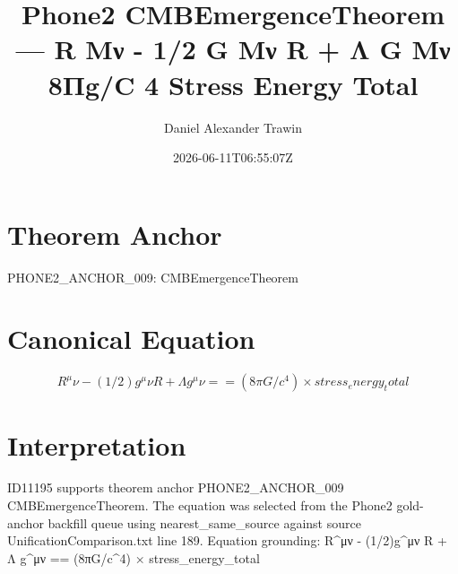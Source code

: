 \documentclass[11pt]{article}
\title{Phone2 CMBEmergenceTheorem — R Μν - 1/2 G Μν R + Λ G Μν 8Πg/C 4 Stress Energy Total}
\author{Daniel Alexander Trawin}
\date{2026-06-11T06:55:07Z}
\begin{document}
\maketitle
\section*{Theorem Anchor}
PHONE2_ANCHOR_009: CMBEmergenceTheorem
\section*{Canonical Equation}
\[
R^μν - (1/2)g^μν R + Λ g^μν == (8πG/c^4) × stress_energy_total
\]
\section*{Interpretation}
ID11195 supports theorem anchor PHONE2_ANCHOR_009 CMBEmergenceTheorem. The equation was selected from the Phone2 gold-anchor backfill queue using nearest_same_source against source UnificationComparison.txt line 189. Equation grounding: R^μν - (1/2)g^μν R + Λ g^μν == (8πG/c^4) × stress_energy_total
\end{document}
